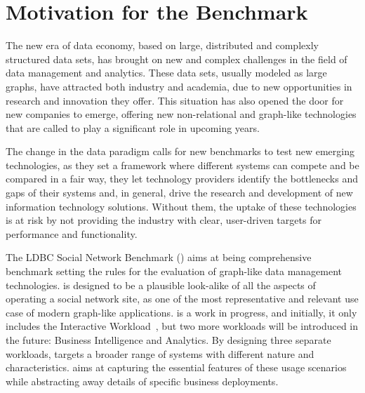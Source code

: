 

\section{Motivation for the Benchmark}

The new era of data economy, based on large, distributed and complexly
structured data sets, has brought on new and complex challenges in the field of
data management and analytics. These data sets, usually modeled as large
graphs, have attracted both industry and academia, due to new
opportunities in research and innovation they offer.  This situation has also
opened the door for new companies to emerge, offering new non-relational and
graph-like technologies that are called to play a significant role in upcoming
years.

The change in the data paradigm calls for new benchmarks to test new
emerging technologies, as they set a framework where different systems can
compete and be compared in a fair way, they let technology providers identify
the bottlenecks and gaps of their systems and, in general, drive the research
and development of new information technology solutions. Without them, the
uptake of these technologies is at risk by not providing the industry with
clear, user-driven targets for performance and functionality.

The LDBC Social Network Benchmark (\ldbcsnb) aims at being comprehensive
benchmark setting the rules for the evaluation of graph-like data management
technologies.  \ldbcsnb is designed to be a plausible look-alike of all the
aspects of operating a social network site, as one of the most representative
and relevant use case of modern graph-like applications. \ldbcsnb is a work in
progress, and initially, it only includes the Interactive Workload~\cite{DBLP:conf/sigmod/ErlingALCGPPB15},
but two more workloads will be introduced in the future: Business
Intelligence and Analytics.  By designing three separate workloads, \ldbcsnb
targets a broader range of systems with different nature and characteristics.
\ldbcsnb aims at capturing the essential features of these usage scenarios
while abstracting away details of specific business deployments.

